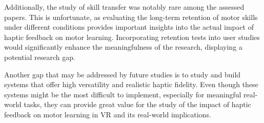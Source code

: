 Additionally, the study of skill transfer was notably rare among the assessed papers. This is unfortunate, as evaluating the long-term retention of motor skills under different conditions provides important insights into the actual impact of haptic feedback on motor learning. Incorporating retention tests into user studies would significantly enhance the meaningfulness of the research, displaying a potential research gap.

Another gap that may be addressed by future studies is to study and build systems that offer high versatility and realistic haptic fidelity. Even though these systems might be the most difficult to implement, especially for meaningful real-world tasks, they can provide great value for the study of the impact of haptic feedback on motor learning in VR and its real-world implications. 
